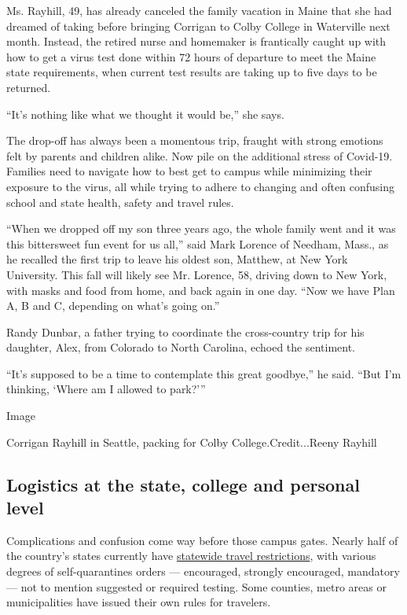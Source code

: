 Ms. Rayhill, 49, has already canceled the family vacation in Maine that
she had dreamed of taking before bringing Corrigan to Colby College in
Waterville next month. Instead, the retired nurse and homemaker is
frantically caught up with how to get a virus test done within 72 hours
of departure to meet the Maine state requirements, when current test
results are taking up to five days to be returned.

``It's nothing like what we thought it would be,'' she says.

The drop-off has always been a momentous trip, fraught with strong
emotions felt by parents and children alike. Now pile on the additional
stress of Covid-19. Families need to navigate how to best get to campus
while minimizing their exposure to the virus, all while trying to adhere
to changing and often confusing school and state health, safety and
travel rules.

``When we dropped off my son three years ago, the whole family went and
it was this bittersweet fun event for us all,'' said Mark Lorence of
Needham, Mass., as he recalled the first trip to leave his oldest son,
Matthew, at New York University. This fall will likely see Mr. Lorence,
58, driving down to New York, with masks and food from home, and back
again in one day. ``Now we have Plan A, B and C, depending on what's
going on.''

Randy Dunbar, a father trying to coordinate the cross-country trip for
his daughter, Alex, from Colorado to North Carolina, echoed the
sentiment.

``It's supposed to be a time to contemplate this great goodbye,'' he
said. ``But I'm thinking, `Where am I allowed to park?'''

Image

Corrigan Rayhill in Seattle, packing for Colby College.Credit...Reeny
Rayhill

\hypertarget{logistics-at-the-state-college-and-personal-level}{%
\subsection{Logistics at the state, college and personal
level}\label{logistics-at-the-state-college-and-personal-level}}

Complications and confusion come way before those campus gates. Nearly
half of the country's states currently have
\href{https://www.nytimes3xbfgragh.onion/2020/07/10/travel/state-travel-restrictions.html}{statewide
travel restrictions}, with various degrees of self-quarantines orders
--- encouraged, strongly encouraged, mandatory --- not to mention
suggested or required testing. Some counties, metro areas or
municipalities have issued their own rules for travelers.

